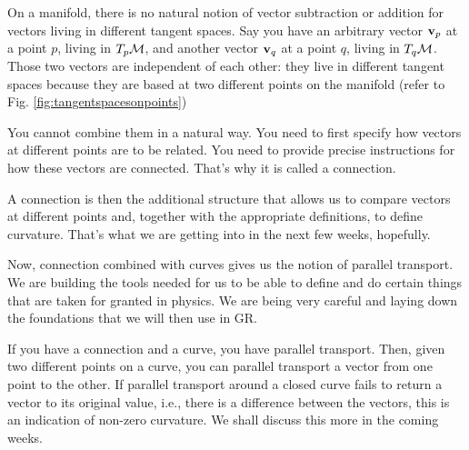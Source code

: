 		On a manifold, there is no natural notion of vector subtraction or addition
		for vectors living in different tangent spaces. Say you have an arbitrary
		vector $\vb{v}_p$ at a point $p$, living in $T_p \mathcal{M}$, and another vector
		$\vb{v}_q$ at a point $q$, living in $T_q\mathcal M$. Those two vectors
		are independent of each other: they live in different tangent spaces
		because they are based at two different points on the manifold (refer to Fig. \ref{fig:tangentspacesonpoints})

		You cannot combine them in a natural way. You need to first specify how
		vectors at different points are to be related. You need to provide precise
		instructions for how these vectors are connected. That's why it is called
		a connection.

		A connection is then the additional structure that allows us to compare
		vectors at different points and, together with the appropriate definitions,
		to define curvature. That's what we are getting into in the next few weeks,
		hopefully.

		Now, connection combined with curves gives us the notion of parallel transport.
		We are building the tools needed for us to be able to define and do certain
		things that are taken for granted in physics. We are being very careful and
		laying down the foundations that we will then use in GR.

		If you have a connection and a curve, you have parallel transport. Then,
		given two different points on a curve, you can parallel transport a vector
		from one point to the other. If parallel transport around a closed curve
		fails to return a vector to its original value, i.e., there is a difference
		between the vectors, this is an indication of
		non-zero curvature. We shall discuss this more in the coming weeks.

